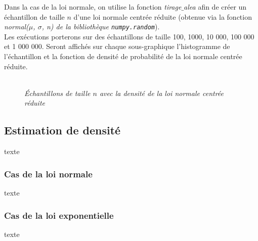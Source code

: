 \documentclass{article}      %
\begin{document}
Dans la cas de la loi normale, on utilise la fonction \textit{tirage$\_$alea} afin de créer un échantillon de taille $n$ d'une loi normale centrée réduite (obtenue via la fonction \textit{normal($\mu$, $\sigma$, n) de la bibliothèque \texttt{numpy.random}}).\\
Les exécutions porterons sur des échantillons de taille 100, 1000, 10 000, 100 000 et 1 000 000.
Seront affichés sur chaque sous-graphique l'histogramme de l'échantillon et la fonction de densité de probabilité de la loi normale centrée réduite.\\
\begin{figure}[H]
	\centering
	\\
	\textit{Échantillons de taille $n$ avec la densité de la loi normale centrée réduite}
\end{figure}

\subsection{Estimation de densité}
texte

\subsubsection{Cas de la loi normale}
texte
\subsubsection{Cas de la loi exponentielle}
texte
\end{document}
